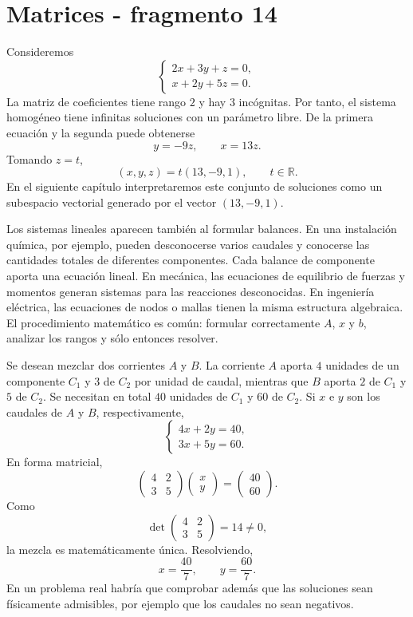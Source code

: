 \section{Matrices - fragmento 14}
\begin{example}
Consideremos
\[
\begin{cases}
2x+3y+z=0,\\
x+2y+5z=0.
\end{cases}
\]
La matriz de coeficientes tiene rango $2$ y hay $3$ incógnitas. Por tanto, el sistema homogéneo tiene infinitas soluciones con un parámetro libre. De la primera ecuación y la segunda puede obtenerse
\[
y=-9z,
\qquad
x=13z.
\]
Tomando $z=t$,
\[
\boxed{(x,y,z)=t(13,-9,1),\qquad t\in\mathbb{R}.}
\]
En el siguiente capítulo interpretaremos este conjunto de soluciones como un subespacio vectorial generado por el vector $(13,-9,1)$.
\end{example}

Los sistemas lineales aparecen también al formular balances. En una instalación química, por ejemplo, pueden desconocerse varios caudales y conocerse las cantidades totales de diferentes componentes. Cada balance de componente aporta una ecuación lineal. En mecánica, las ecuaciones de equilibrio de fuerzas y momentos generan sistemas para las reacciones desconocidas. En ingeniería eléctrica, las ecuaciones de nodos o mallas tienen la misma estructura algebraica. El procedimiento matemático es común: formular correctamente $A$, $x$ y $b$, analizar los rangos y sólo entonces resolver.

\begin{example}
Se desean mezclar dos corrientes $A$ y $B$. La corriente $A$ aporta $4$ unidades de un componente $C_1$ y $3$ de $C_2$ por unidad de caudal, mientras que $B$ aporta $2$ de $C_1$ y $5$ de $C_2$. Se necesitan en total $40$ unidades de $C_1$ y $60$ de $C_2$. Si $x$ e $y$ son los caudales de $A$ y $B$, respectivamente,
\[
\begin{cases}
4x+2y=40,\\
3x+5y=60.
\end{cases}
\]
En forma matricial,
\[
\begin{pmatrix}4&2\\3&5\end{pmatrix}
\begin{pmatrix}x\\y\end{pmatrix}
=
\begin{pmatrix}40\\60\end{pmatrix}.
\]
Como
\[
\det\begin{pmatrix}4&2\\3&5\end{pmatrix}=14\neq0,
\]
la mezcla es matemáticamente única. Resolviendo,
\[
\boxed{x=\frac{40}{7},\qquad y=\frac{60}{7}.}
\]
En un problema real habría que comprobar además que las soluciones sean físicamente admisibles, por ejemplo que los caudales no sean negativos.
\end{example}
